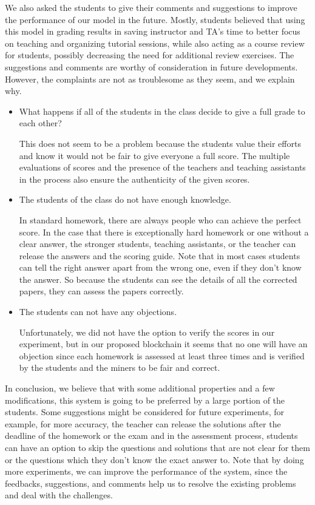 \documentclass[manuscript,review,anonymous]{acmart}%
\begin{document}
We also asked the students to give their comments and suggestions to improve the performance of our model in the future.
Mostly, students believed that using this model in grading results in saving instructor and TA's time to better focus on teaching and organizing tutorial sessions, while also acting as a course review for students, possibly decreasing the need for additional review exercises.
The suggestions and comments are worthy of consideration in future developments. However, the complaints are not as troublesome as they seem, and we explain why.
\begin{itemize}
\item What happens if all of the students in the class decide to give a full grade to each other?

This does not seem to be a problem because the students value their efforts and know it would not be fair to give everyone a full score.
The multiple evaluations of scores and the presence of the teachers and teaching assistants in the process also ensure the authenticity of the given scores.

\item The students of the class do not have enough knowledge.

In standard homework, there are always people who can achieve the perfect score. 
In the case that there is exceptionally hard homework or one without a clear answer, the stronger students, teaching assistants, or the teacher can release the answers and the scoring guide.
Note that in most cases students can tell the right answer apart from the wrong one, even if they don't know the answer. So
because the students can see the details of all the corrected papers, they can assess the papers correctly.

\item The students can not have any objections.

Unfortunately, we did not have the option to verify the scores in our experiment, but in our proposed blockchain it seems that no one will have an objection since each homework is assessed at least three times and is verified by the students and the miners to be fair and correct.



\end{itemize} 
In conclusion, we believe that with some additional properties and a few modifications, this system is going to be preferred by a large portion of the students.
Some suggestions might be considered for future experiments, for example, for more accuracy, the teacher can release the solutions after the deadline of the homework or the exam and in the assessment process, students can have an option to skip the questions and solutions that are not clear for them or the questions which they don't know the exact answer to.
Note that by doing more experiments, we can improve the performance of the system, since the feedbacks, suggestions, and comments help us to resolve the existing problems and deal with the challenges.
\end{document}
